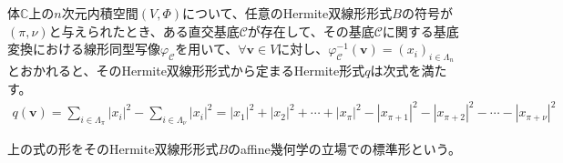 \documentclass[dvipdfmx]{jsarticle}
\begin{document}
\begin{thm}[affine幾何学の立場での標準形]\label{2.3.10.5}
体$\mathbb{C}$上の$n$次元内積空間$(V,\varPhi)$について、任意のHermite双線形形式$B$の符号が$(\pi,\nu)$と与えられたとき、ある直交基底$\mathcal{C}$が存在して、その基底$\mathcal{C}$に関する基底変換における線形同型写像$\varphi_{\mathcal{C}}$を用いて、$\forall\mathbf{v} \in V$に対し、$\varphi_{\mathcal{C}}^{- 1}\left( \mathbf{v} \right) = \left( x_{i} \right)_{i \in \varLambda_{n}}$とおかれると、そのHermite双線形形式から定まるHermite形式$q$は次式を満たす。
\begin{align*}
q\left( \mathbf{v} \right) = \sum_{i \in \varLambda_{\pi}} \left| x_{i} \right|^{2} - \sum_{i \in \varLambda_{\nu}} \left| x_{i} \right|^{2} = \left| x_{1} \right|^{2} + \left| x_{2} \right|^{2} + \cdots + \left| x_{\pi} \right|^{2} - \left| x_{\pi + 1} \right|^{2} - \left| x_{\pi + 2} \right|^{2} - \cdots - \left| x_{\pi + \nu} \right|^{2}
\end{align*}
\end{thm}
\begin{dfn}
上の式の形をそのHermite双線形形式$B$のaffine幾何学の立場での標準形という。
\end{dfn}
\end{document}
